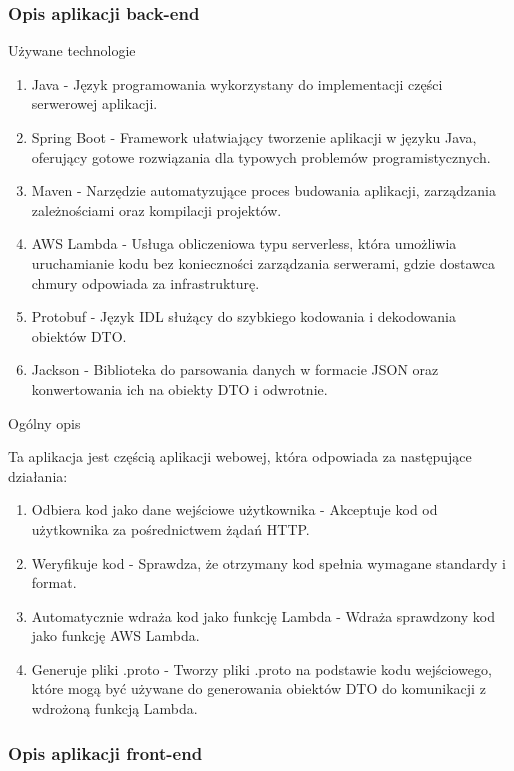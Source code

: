 \documentclass[runningheads,12pt]{llncs}
\begin{document}
\subsubsection{Opis aplikacji back-end}

Używane technologie

\begin{enumerate}
    \item Java - Język programowania wykorzystany do implementacji części serwerowej aplikacji.
    \item Spring Boot - Framework ułatwiający tworzenie aplikacji w języku Java, oferujący gotowe rozwiązania dla typowych problemów programistycznych.
    \item Maven - Narzędzie automatyzujące proces budowania aplikacji, zarządzania zależnościami oraz kompilacji projektów.
    \item AWS Lambda - Usługa obliczeniowa typu serverless, która umożliwia uruchamianie kodu bez konieczności zarządzania serwerami, gdzie dostawca chmury odpowiada za infrastrukturę.
    \item Protobuf - Język IDL służący do szybkiego kodowania i dekodowania obiektów DTO.
    \item Jackson - Biblioteka do parsowania danych w formacie JSON oraz konwertowania ich na obiekty DTO i odwrotnie.
\end{enumerate}

Ogólny opis

Ta aplikacja jest częścią aplikacji webowej, która odpowiada za następujące działania:
\begin{enumerate}
    \item Odbiera kod jako dane wejściowe użytkownika - Akceptuje kod od użytkownika za pośrednictwem żądań HTTP.
    \item Weryfikuje kod - Sprawdza, że otrzymany kod spełnia wymagane standardy i format.
    \item Automatycznie wdraża kod jako funkcję Lambda -  Wdraża sprawdzony kod jako funkcję AWS Lambda.
    \item Generuje pliki .proto - Tworzy pliki .proto na podstawie kodu wejściowego, które mogą być używane do generowania obiektów DTO do komunikacji z wdrożoną funkcją Lambda.
\end{enumerate}


\subsubsection{Opis aplikacji front-end}
\end{document}
